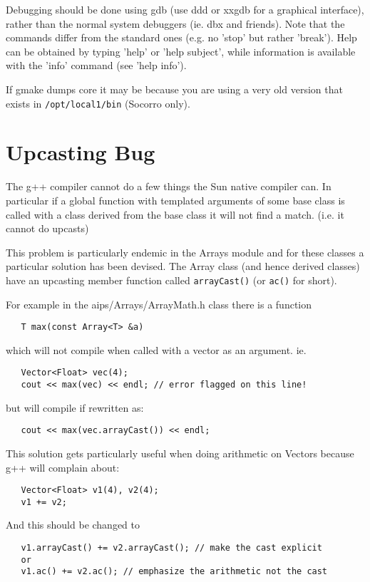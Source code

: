 Debugging should be done using gdb (use ddd or xxgdb for a graphical
interface), rather than the normal system debuggers (ie. dbx and
friends). Note that the commands differ from the standard ones (e.g.
no 'stop' but rather 'break').  Help can be obtained by typing 'help'
or 'help subject', while information is available with the 'info'
command (see 'help info').

If gmake dumps core it may be because you are using a very old version
that exists in \texttt{/opt/local1/bin} (Socorro only).
   
\section{Upcasting Bug\label{sec:upcast}}
The g++ compiler cannot do a few things the Sun native compiler can.
In particular if a global function with templated arguments of some
base class is called with a class derived from the base class it will
not find a match. (i.e. it cannot do upcasts)

This problem is particularly endemic in the Arrays module and for
these classes a particular solution has been devised. The Array class
(and hence derived classes) have an upcasting member function called
\texttt{arrayCast()} (or \texttt{ac()} for short).

For example in the aips/Arrays/ArrayMath.h class there is a function
\begin{verbatim}
   T max(const Array<T> &a) 
\end{verbatim}
which will not compile when called with a vector as an argument. ie.
\begin{verbatim}
   Vector<Float> vec(4);
   cout << max(vec) << endl; // error flagged on this line!
\end{verbatim}
but will compile if rewritten as:
\begin{verbatim}
   cout << max(vec.arrayCast()) << endl; 
\end{verbatim}

This solution gets particularly useful when doing arithmetic on
Vectors because g++ will complain about:
\begin{verbatim}
   Vector<Float> v1(4), v2(4);
   v1 += v2;
\end{verbatim}
And this should be changed to
\begin{verbatim}
   v1.arrayCast() += v2.arrayCast(); // make the cast explicit
   or 
   v1.ac() += v2.ac(); // emphasize the arithmetic not the cast
\end{verbatim}


